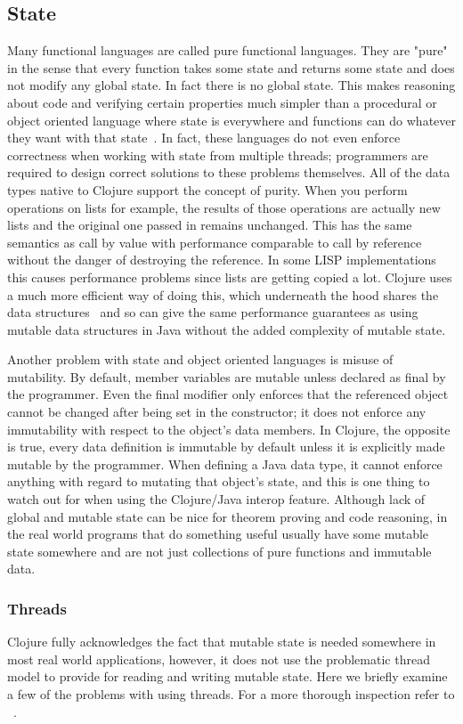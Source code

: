 \subsection{State}
Many functional languages are called pure functional languages. 
They are "pure" in the sense that every function takes some state and
returns some state and does not modify any global state. 
In fact there is no global state. 
This makes reasoning about code and verifying certain properties much
simpler than a procedural or object oriented language where state is
everywhere and functions can do whatever they want with that
state~\cite{process}. 
In fact, these languages do not even enforce correctness when working
with state from multiple threads; programmers are required to design
correct solutions to these problems themselves.
All of the data types native to Clojure support the concept of purity. 
When you perform operations on lists for example, the results of
 those operations are actually new lists and the original one passed
 in remains unchanged. 
This has the same semantics as call by value with performance
comparable to call by reference without the danger of destroying the
reference. 
In some LISP implementations this causes performance problems
since lists are getting copied a lot. 
Clojure uses a much more efficient way of doing this, which underneath the hood shares the data
structures~\cite{cljDataStructures} and so can give the same
performance guarantees as using mutable data structures in Java
without the added complexity of mutable state.
 
Another problem with state and object oriented languages is misuse of
mutability. 
By default, member variables are mutable unless declared as final by
the programmer. 
Even the final modifier only enforces that the referenced object
cannot be changed after being set in the constructor; it does not
enforce any immutability with respect to the object's data members. 
In Clojure, the opposite is true, every data definition is immutable
by default unless it is explicitly made mutable by the
programmer. 
When defining a Java data type, it cannot enforce anything with regard
to mutating that object's state, and this is one thing to watch out
for when using the Clojure/Java interop feature. 
Although lack of global and mutable state can be nice for theorem proving and code reasoning, in the real world programs that do something useful usually have some mutable state somewhere and are not just collections of pure functions and immutable data.  

\subsubsection{Threads}
Clojure fully acknowledges the fact that mutable state is needed
somewhere in most real world applications, however, it does not use
the problematic thread model to provide for reading and writing
mutable state. 
Here we briefly examine a few of the problems with using threads. 
For a more thorough inspection refer to ~\cite{1076522}.

